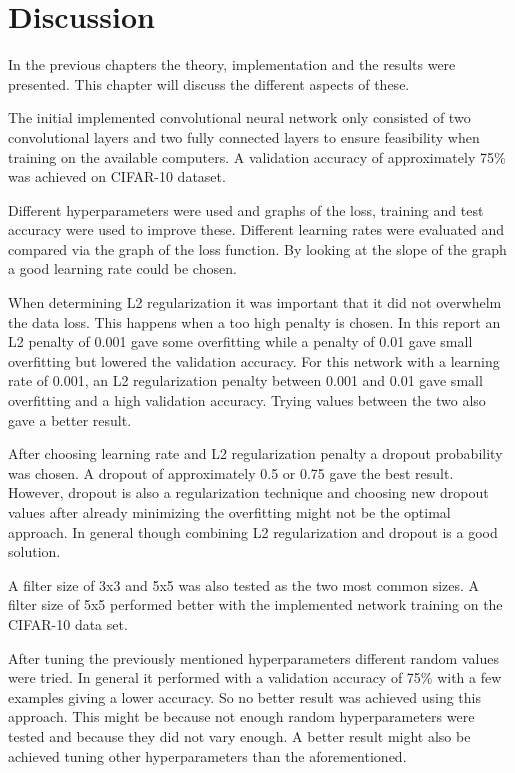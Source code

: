\chapter{Discussion}
\label{chp:disc}

In the previous chapters the theory, implementation and the results were presented. This chapter will discuss the different aspects of these.

The initial implemented convolutional neural network only consisted of two convolutional layers and two fully connected layers to ensure feasibility when training on the available computers. A validation accuracy of approximately 75\% was achieved on CIFAR-10 dataset.

Different hyperparameters were used and graphs of the loss, training and test accuracy were used to improve these. Different learning rates were evaluated and compared via the graph of the loss function. By looking at the slope of the graph a good learning rate could be chosen.

When determining L2 regularization it was important that it did not overwhelm the data loss. This happens when a too high penalty is chosen. In this report an L2 penalty of 0.001 gave some overfitting while a penalty of 0.01 gave small overfitting but lowered the validation accuracy. For this network with a learning rate of 0.001, an L2 regularization penalty between 0.001 and 0.01 gave small overfitting and a high validation accuracy. Trying values between the two also gave a better result.

After choosing learning rate and L2 regularization penalty a dropout probability was chosen. A dropout of approximately 0.5 or 0.75 gave the best result. However, dropout is also a regularization technique and choosing new dropout values after already minimizing the overfitting might not be the optimal approach. In general though combining L2 regularization and dropout is a good solution. 

A filter size of 3x3 and 5x5 was also tested as the two most common sizes. A filter size of 5x5 performed better with the implemented network training on the CIFAR-10 data set.

After tuning the previously mentioned hyperparameters different random values were tried. In general it performed with a validation accuracy of 75\% with a few examples giving a lower accuracy. So no better result was achieved using this approach. This might be because not enough random hyperparameters were tested and because they did not vary enough. A better result might also be achieved tuning other hyperparameters than the aforementioned.

